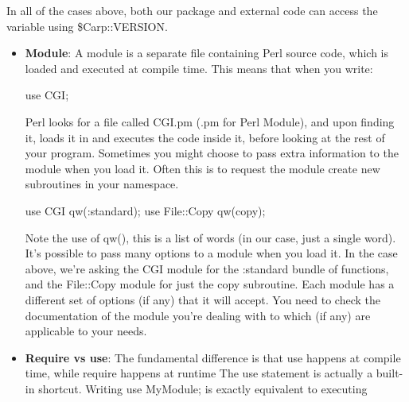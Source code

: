 \documentclass{report}
\begin{document}
\begin{itemize}
            In all of the cases above, both our package and external code can access the variable using \$Carp::VERSION.

    \end{itemize}

    \pagebreak 
    \begin{itemize}
        \item \textbf{Module}: A module is a separate file containing Perl source code, which is loaded and executed at compile time. This means that when you write:
            \bigbreak \noindent 
            \begin{perlcode}
            use CGI;
            \end{perlcode}
            \bigbreak \noindent 
            Perl looks for a file called CGI.pm (.pm for Perl Module), and upon finding it, loads it in and executes the code inside it, before looking at the rest of your program.
            \bigbreak \noindent 
            Sometimes you might choose to pass extra information to the module when you load it. Often this is to request the module create new subroutines in your namespace.
            \bigbreak \noindent 
            \begin{perlcode}
                use CGI qw(:standard);
                use File::Copy qw(copy);
            \end{perlcode}
            \bigbreak \noindent 
            Note the use of qw(), this is a list of words (in our case, just a single word). It’s possible to pass many options to a module when you load it. In the case above, we’re asking the CGI module for the :standard bundle of functions, and the File::Copy module for just the copy subroutine.
            \bigbreak \noindent 
            Each module has a different set of options (if any) that it will accept. You need to check the documentation of the module you’re dealing with to which (if any) are applicable to your needs.
        \item \textbf{Require vs use}: The fundamental difference is that use happens at compile time, while require happens at runtime
            \bigbreak \noindent 
            The use statement is actually a built-in shortcut. Writing use MyModule; is exactly equivalent to executing

\end{itemize}
\end{document}
